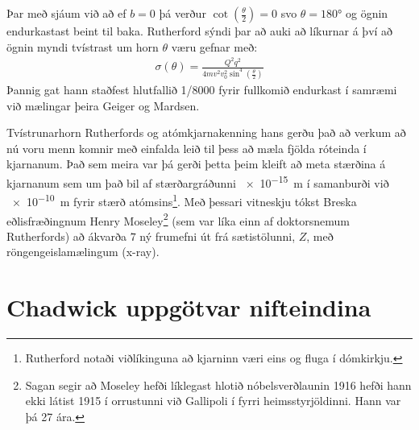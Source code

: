 \begin{figure}[H]
    \centering
{}
\end{figure}
Þar með sjáum við að ef $b = 0$ þá verður $\cot(\frac{\theta}{2}) = 0$ svo $\theta = \ang{180}$ og ögnin endurkastast beint til baka. Rutherford sýndi þar að auki að líkurnar á því að ögnin myndi tvístrast um horn $\theta$ væru gefnar með:
\begin{align*}
    \sigma(\theta) = \frac{Q^2q^2}{4mv^2v_0^2\sin^4(\frac{\theta}{2})}
\end{align*}
Þannig gat hann staðfest hlutfallið 1/8000 fyrir fullkomið endurkast í samræmi við mælingar þeira Geiger og Mardsen.

Tvístrunarhorn Rutherfords og atómkjarnakenning hans gerðu það að verkum að nú voru menn komnir með einfalda leið til þess að mæla fjölda róteinda í kjarnanum. Það sem meira var þá gerði þetta þeim kleift að meta stærðina á kjarnanum sem um það bil af stærðargráðunni \SI{e-15}{m} í samanburði við \SI{e-10}{m} fyrir stærð atómsins\footnote{Rutherford notaði viðlíkinguna að kjarninn væri eins og fluga í dómkirkju.}. Með þessari vitneskju tókst Breska eðlisfræðingnum Henry Moseley\footnote{Sagan segir að Moseley hefði líklegast hlotið nóbelsverðlaunin 1916 hefði hann ekki látist 1915 í orrustunni við Gallipoli í fyrri heimsstyrjöldinni. Hann var þá 27 ára.} (sem var líka einn af doktorsnemum Rutherfords) að ákvarða $7$ ný frumefni út frá sætistölunni, $Z$, með röngengeislamælingum (x-ray). \\

\section{Chadwick uppgötvar nifteindina}

